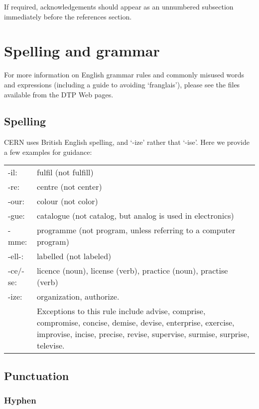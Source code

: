 \documentclass{cernrep}
\begin{document}
If required, acknowledgements should appear as an unnumbered
subsection immediately before the references section.

\section{Spelling and grammar}

For more information on English grammar rules and commonly misused
words and expressions (including a guide to avoiding `franglais'),
please see the files available from the DTP Web pages.

\subsection{Spelling}

CERN uses British English spelling, and `-ize' rather that
`-ise'. Here we provide a few examples for guidance:
\begin{flushleft}
\begin{tabularx}{\linewidth}{@{}lX}
-il:     & fulfil (not fulfill) \\
-re:     & centre (not center) \\
-our:    & colour (not color) \\ 
-gue:    & catalogue (not catalog, but analog is used in electronics) \\ 
-mme:    & programme (not program, unless referring to a computer
           program) \\ 
-ell-:   & labelled (not labeled) \\ 
-ce/-se: & licence (noun), license (verb), practice (noun), practise (verb) \\ 
-ize:    & organization, authorize. \\
         & Exceptions to this rule include advise, comprise, compromise, 
           concise, demise, devise, enterprise, exercise, improvise, 
           incise, precise, revise, supervise, surmise, surprise, televise.\\
\end{tabularx}
\end{flushleft}

\subsection{Punctuation}

\subsubsection{Hyphen}
\end{document}
